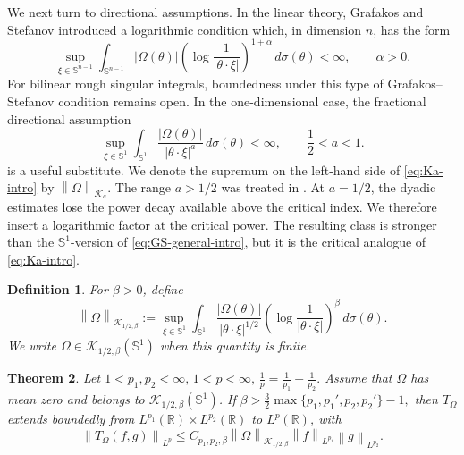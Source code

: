 \documentclass[11pt]{amsart}
\newtheorem{definition}{Definition}[section]
\newtheorem{theorem}[definition]{Theorem}
\theoremstyle{remark}
\numberwithin{equation}{section}
\newcommand{\R}{\mathbb R}
\newcommand{\Sph}{\mathbb S^1}
\newcommand{\cK}{\mathcal K}
\newcommand{\norm}[1]{\left\lVert #1\right\rVert}
\begin{document}
	We next turn to directional assumptions.  In the linear theory, Grafakos and
	Stefanov \cite{GrafakosStefanov1998} introduced a logarithmic condition which,
	in dimension \(n\), has the form
	\begin{equation}\label{eq:GS-general-intro}
		\sup_{\xi\in\mathbb S^{n-1}}
		\int_{\mathbb S^{n-1}}
		|\Omega(\theta)|
		\left(\log \frac1{|\theta\cdot\xi|}\right)^{1+\alpha}
		\,d\sigma(\theta)<\infty,
		\qquad \alpha>0.
	\end{equation}
	For bilinear rough singular integrals, boundedness under this type of
	Grafakos--Stefanov condition remains open.  In the one-dimensional case, the
	fractional directional assumption
	\begin{equation}\label{eq:Ka-intro}
		\sup_{\xi\in\Sph}
		\int_{\Sph}
		\frac{|\Omega(\theta)|}{|\theta\cdot\xi|^a}
		\,d\sigma(\theta)<\infty,
		\qquad \frac12<a<1.
	\end{equation}
	is a useful substitute.  We denote the supremum on the left-hand side of
	\eqref{eq:Ka-intro} by \(\norm{\Omega}_{\cK_a}\).
	The range \(a>1/2\) was treated in \cite{DQX0404}.  At \(a=1/2\), the dyadic
	estimates lose the power decay available above the critical index.  We
	therefore insert a logarithmic factor at the critical power.  The resulting
	class is stronger than the \(\Sph\)-version of \eqref{eq:GS-general-intro}, but
	it is the critical analogue of \eqref{eq:Ka-intro}.
	
	\begin{definition}\label{def:Klog}
		For \(\beta>0\), define
		\[
		\norm{\Omega}_{\cK_{1/2,\beta}}
		:=
		\sup_{\xi\in \Sph}
		\int_{\Sph}
		\frac{|\Omega(\theta)|}{|\theta\cdot\xi|^{1/2}}
		\left(\log\frac1{|\theta\cdot\xi|}\right)^\beta
		\,d\sigma(\theta).
		\]
		We write \(\Omega\in\cK_{1/2,\beta}(\Sph)\) when this quantity is
		finite.
	\end{definition}
	
	\begin{theorem}\label{thm:Klog-main}
		Let
		$
		1<p_1,p_2<\infty,\,
		1<p<\infty,\,
		\frac1p=\frac1{p_1}+\frac1{p_2}.
		$
		Assume that \(\Omega\) has mean zero and belongs to
		\(\cK_{1/2,\beta}(\Sph)\). If
		$
		\beta>\frac32\max\{p_1,p_1',p_2,p_2'\}-1,
		$
		then \(T_\Omega\) extends boundedly from
		\(L^{p_1}(\R)\times L^{p_2}(\R)\) to \(L^p(\R)\), with
		\[
		\norm{T_\Omega(f,g)}_{L^p}
		\le
		C_{p_1,p_2,\beta}
		\norm{\Omega}_{\cK_{1/2,\beta}}
		\norm f_{L^{p_1}}\norm g_{L^{p_2}}.
		\]
	\end{theorem}
	
\end{document}
